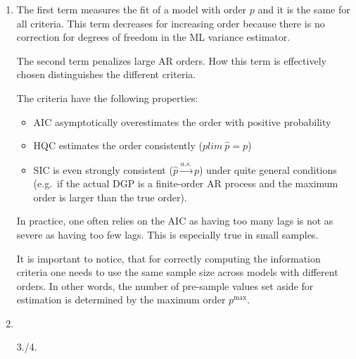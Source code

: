 \begin{enumerate}
\item The first term measures the fit of a model with order \(p\) and it is the same for all criteria.
This term decreases for increasing order because there is no correction for degrees of freedom in the ML variance estimator.
	
The second term penalizes large AR orders.
How this term is effectively chosen distinguishes the different criteria.

The criteria have the following properties:
\begin{itemize}
    \item AIC asymptotically overestimates the order with positive probability
    \item HQC estimates the order consistently (\(plim~ \hat{p}= p\))
    \item SIC is even strongly consistent (\(\hat{p} \overset{a.s.}{\rightarrow} p\)) under quite general conditions
    (e.g.\ if the actual DGP is a finite-order AR process and the maximum order is larger than the true order).
\end{itemize}
In practice, one often relies on the AIC as having too many lags is not as severe as having too few lags.
This is especially true in small samples.

It is important to notice, that for correctly computing the information criteria
  one needs to use the same sample size across models with different orders.
In other words, the number of pre-sample values set aside for estimation is determined by the maximum order \(p^{\text{max}}\).

	
\item 

\item[3./4.] 
\end{enumerate}